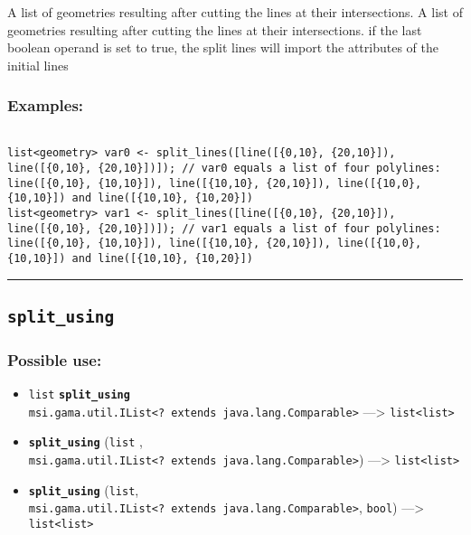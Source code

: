 \documentclass[]{book}
\providecommand{\tightlist}{%
  \setlength{\itemsep}{0pt}\setlength{\parskip}{0pt}}
\theoremstyle{definition}
\theoremstyle{definition}
\theoremstyle{definition}
\theoremstyle{remark}
\begin{document}
A list of geometries resulting after cutting the lines at their
intersections. A list of geometries resulting after cutting the lines at
their intersections. if the last boolean operand is set to true, the
split lines will import the attributes of the initial lines

\subsubsection{Examples:}\label{examples-345}

\begin{verbatim}
 
list<geometry> var0 <- split_lines([line([{0,10}, {20,10}]), line([{0,10}, {20,10}])]); // var0 equals a list of four polylines: line([{0,10}, {10,10}]), line([{10,10}, {20,10}]), line([{10,0}, {10,10}]) and line([{10,10}, {10,20}]) 
list<geometry> var1 <- split_lines([line([{0,10}, {20,10}]), line([{0,10}, {20,10}])]); // var1 equals a list of four polylines: line([{0,10}, {10,10}]), line([{10,10}, {20,10}]), line([{10,0}, {10,10}]) and line([{10,10}, {10,20}])
\end{verbatim}

\begin{center}\rule{0.5\linewidth}{\linethickness}\end{center}

\subsection{\texorpdfstring{\texttt{split\_using}}{split\_using}}\label{split_using}

\subsubsection{Possible use:}\label{possible-use-496}

\begin{itemize}
\tightlist
\item
  \texttt{list} \textbf{\texttt{split\_using}}
  \texttt{msi.gama.util.IList\textless{}?\ extends\ java.lang.Comparable\textgreater{}}
  ---\textgreater{} \texttt{list\textless{}list\textgreater{}}
\item
  \textbf{\texttt{split\_using}} (\texttt{list} ,
  \texttt{msi.gama.util.IList\textless{}?\ extends\ java.lang.Comparable\textgreater{}})
  ---\textgreater{} \texttt{list\textless{}list\textgreater{}}
\item
  \textbf{\texttt{split\_using}} (\texttt{list},
  \texttt{msi.gama.util.IList\textless{}?\ extends\ java.lang.Comparable\textgreater{}},
  \texttt{bool}) ---\textgreater{}
  \texttt{list\textless{}list\textgreater{}}
\end{itemize}
\end{document}

